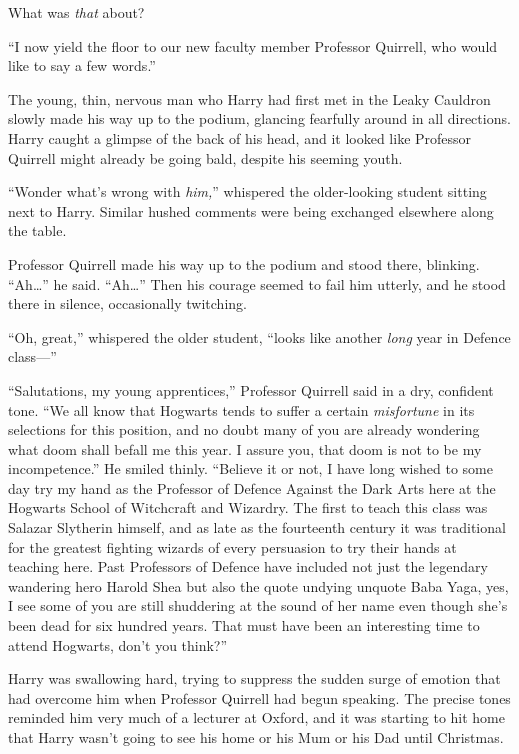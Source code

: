 What was \emph{that} about?

“I now yield the floor to our new faculty member Professor Quirrell, who would like to say a few words.”

The young, thin, nervous man who Harry had first met in the Leaky Cauldron slowly made his way up to the podium, glancing fearfully around in all directions. Harry caught a glimpse of the back of his head, and it looked like Professor Quirrell might already be going bald, despite his seeming youth.

“Wonder what’s wrong with \emph{him,}” whispered the older-looking student sitting next to Harry. Similar hushed comments were being exchanged elsewhere along the table.

Professor Quirrell made his way up to the podium and stood there, blinking. “Ah…” he said. “Ah…” Then his courage seemed to fail him utterly, and he stood there in silence, occasionally twitching.

“Oh, great,” whispered the older student, “looks like another \emph{long} year in Defence class—”

“Salutations, my young apprentices,” Professor Quirrell said in a dry, confident tone. “We all know that Hogwarts tends to suffer a certain \emph{misfortune} in its selections for this position, and no doubt many of you are already wondering what doom shall befall me this year. I assure you, that doom is not to be my incompetence.” He smiled thinly. “Believe it or not, I have long wished to some day try my hand as the Professor of Defence Against the Dark Arts here at the Hogwarts School of Witchcraft and Wizardry. The first to teach this class was Salazar Slytherin himself, and as late as the fourteenth century it was traditional for the greatest fighting wizards of every persuasion to try their hands at teaching here. Past Professors of Defence have included not just the legendary wandering hero Harold Shea but also the quote undying unquote Baba Yaga, yes, I see some of you are still shuddering at the sound of her name even though she’s been dead for six hundred years. That must have been an interesting time to attend Hogwarts, don’t you think?”

Harry was swallowing hard, trying to suppress the sudden surge of emotion that had overcome him when Professor Quirrell had begun speaking. The precise tones reminded him very much of a lecturer at Oxford, and it was starting to hit home that Harry wasn’t going to see his home or his Mum or his Dad until Christmas.

